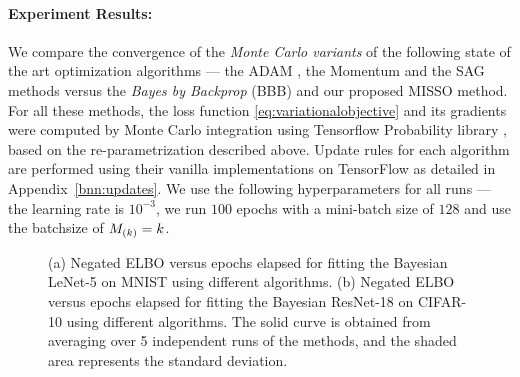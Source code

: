 \documentclass[11pt]{article}
\theoremstyle{t}
\begin{document}
\paragraph{Experiment Results:}
We compare the convergence of the \textit{Monte Carlo variants} of the following state of the art optimization algorithms --- the ADAM \citep{kingma:adam}, the Momentum \citep{sutskever2013importance} and the SAG \citep{schmidt2017minimizing} methods versus the \textit{Bayes by Backprop} (BBB) \citep{blundell2015weight} and our proposed MISSO method.
For all these methods, the loss function \eqref{eq:variationalobjective} and its gradients were computed by Monte Carlo integration using Tensorflow Probability library \citep{dillon2017tfp}, based on the re-parametrization described above.
Update rules for each algorithm are performed using their vanilla implementations on TensorFlow \citep{tensorflow2015-whitepaper} as detailed in Appendix~\ref{bnn:updates}.
We use the following hyperparameters for all runs --- the learning rate is $10^{-3}$, we run $100$ epochs with a mini-batch size of $128$ and use the batchsize of $\Bsize{k} = k$.\vspace{-.2cm}


\begin{figure}[H]
    \centering
    \qquad
  \caption{(a)  Negated ELBO versus epochs elapsed for fitting the Bayesian LeNet-5 on MNIST using different algorithms.
(b) Negated ELBO versus epochs elapsed for fitting the Bayesian ResNet-18 on CIFAR-10 using different algorithms.
The solid curve is obtained from averaging over 5 independent runs of the methods, and the shaded area represents the standard deviation.}\label{fig:lenetopt}
\end{figure}
\end{document}
